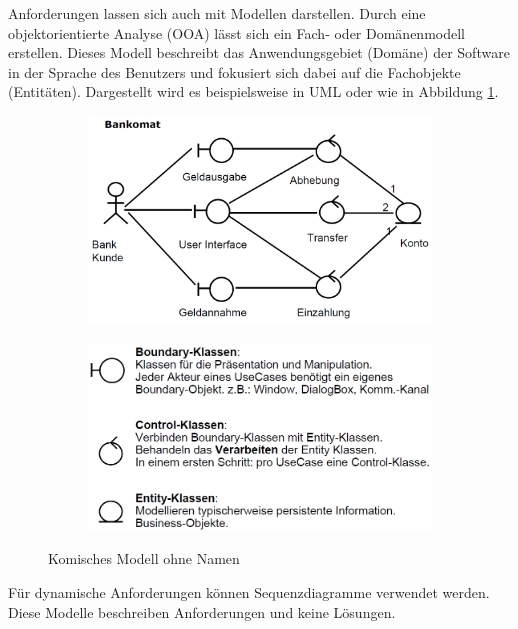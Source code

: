 Anforderungen lassen sich auch mit Modellen darstellen. Durch eine objektorientierte Analyse (OOA) lässt sich ein Fach- oder Domänenmodell erstellen. Dieses Modell beschreibt das Anwendungsgebiet (Domäne) der Software in der Sprache des Benutzers und fokusiert sich dabei auf die Fachobjekte (Entitäten). Dargestellt wird es beispielsweise in UML oder wie in Abbildung \ref{fig:komisches-modell-ohne-namen}.
\begin{figure}
	\centering
	\begin{subfigure}[b]{0.4\textwidth}
		\includegraphics[width=\linewidth]{fig/komisches-modell-ohne-namen-1}
	\end{subfigure}
	\begin{subfigure}[b]{0.5\textwidth}
		\includegraphics[width=\linewidth]{fig/komisches-modell-ohne-namen-2}
	\end{subfigure}
	\caption{Komisches Modell ohne Namen}
	\label{fig:komisches-modell-ohne-namen}
\end{figure}
Für dynamische Anforderungen können Sequenzdiagramme verwendet werden. Diese Modelle beschreiben Anforderungen und keine Lösungen.

